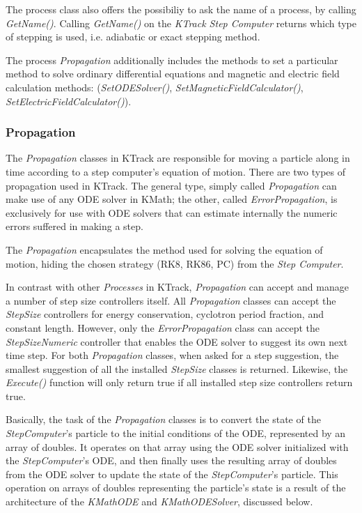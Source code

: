 The process class also offers the possibiliy to ask the name of a process, by calling \textit{GetName()}. Calling \textit{GetName()} on the \textit{KTrack Step Computer} returns which type of stepping is used, i.e. adiabatic or exact stepping method. 

The process \textit{Propagation} additionally includes the methods to set a particular method to solve ordinary differential equations and magnetic and electric field calculation methods: (\textit{SetODESolver()}, \textit{SetMagneticFieldCalculator()}, \textit{SetElectricFieldCalculator()}).
          
          
    \subsubsection*{Propagation}
    The \textit{Propagation} classes in KTrack are responsible for moving a particle along in time according to a step computer's equation of motion.  There are two types of propagation used in KTrack.  The general type, simply called \textit{Propagation} can make use of any ODE solver in KMath; the other, called \textit{ErrorPropagation}, is exclusively for use with ODE solvers that can estimate internally the numeric errors suffered in making a step.
    
The \textit{Propagation} encapsulates the method used for solving the equation of motion, hiding the chosen strategy (RK8, RK86, PC) from the \textit{Step Computer}.  

    In contrast with other \textit{Processes} in KTrack, \textit{Propagation} can accept and manage a number of step size controllers itself.  All \textit{Propagation} classes can accept the \textit{StepSize} controllers for energy conservation, cyclotron period fraction, and constant length.  However, only the \textit{ErrorPropagation} class can accept the \textit{StepSizeNumeric} controller that enables the ODE solver to suggest its own next time step.  For both \textit{Propagation} classes, when asked for a step suggestion, the smallest suggestion of all the installed \textit{StepSize} classes is returned.  Likewise, the \textit{Execute()} function will only return true if all installed step size controllers return true. 
    
    Basically, the task of the \textit{Propagation} classes is to convert the state of the \textit{StepComputer}'s particle to the initial conditions of the ODE, represented by an array of doubles. It operates on that array using the ODE solver initialized with the \textit{StepComputer}'s ODE, and then finally uses the resulting array of doubles from the ODE solver to update the state of the \textit{StepComputer}'s particle.  This operation on arrays of doubles representing the particle's state is a result of the architecture of the \textit{KMathODE} and \textit{KMathODESolver}, discussed below.
    
